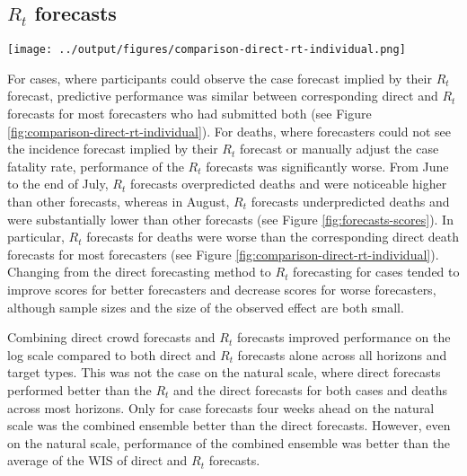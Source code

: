 \documentclass[10pt,a4paper,twocolumn]{article}
\begin{document}
\subsection*{$R_t$ forecasts}

\begin{figure*}
\centering
\texttt{[image: ../output/figures/comparison-direct-rt-individual.png]}
\caption{\bf{Comparison of predictive performance of individual forecasters using either the direct forecasting or $R_t$ interface}. Comparisons are based only on those instances where forecasters have submitted a prediction using both interfaces. The absolute level for a given forecaster relative to others is not meaningful as forecasters differ in the amounts of forecasts they have submitted and when.}
\label{fig:comparison-direct-rt-individual}
\end{figure*}
For cases, where participants could observe the case forecast implied by their $R_t$ forecast, predictive performance was similar between corresponding direct and $R_t$ forecasts for most forecasters who had submitted both (see Figure \ref{fig:comparison-direct-rt-individual}). For deaths, where forecasters could not see the incidence forecast implied by their $R_t$ forecast or manually adjust the case fatality rate, performance of the $R_t$ forecasts was significantly worse. From June to the end of July, $R_t$ forecasts overpredicted deaths and were noticeable higher than other forecasts, whereas in August, $R_t$ forecasts underpredicted deaths and were substantially lower than other forecasts (see Figure \ref{fig:forecasts-scores}). In particular, $R_t$ forecasts for deaths were worse than the corresponding direct death forecasts for most forecasters (see Figure \ref{fig:comparison-direct-rt-individual}). Changing from the direct forecasting method to $R_t$ forecasting for cases tended to improve scores for better forecasters and decrease scores for worse forecasters, although sample sizes and the size of the observed effect are both small. 

Combining direct crowd forecasts and $R_t$ forecasts improved performance on the log scale compared to both direct and $R_t$ forecasts alone across all horizons and target types. This was not the case on the natural scale, where direct forecasts performed better than the $R_t$ and the direct forecasts for both cases and deaths across most horizons. Only for case forecasts four weeks ahead on the natural scale was the combined ensemble better than the direct forecasts. However, even on the natural scale, performance of the combined ensemble was better than the average of the WIS of direct and $R_t$ forecasts. 
\end{document}
